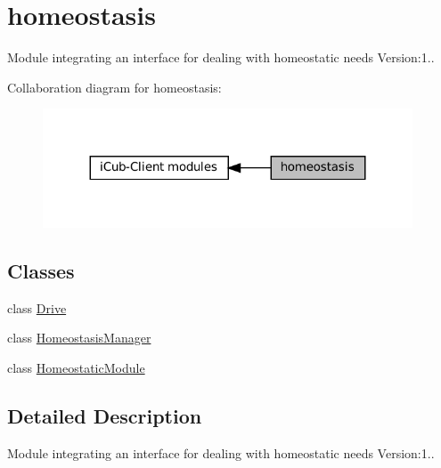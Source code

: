 \hypertarget{group__homeostasis}{}\section{homeostasis}
\label{group__homeostasis}


Module integrating an interface for dealing with homeostatic needs Version\+:1..  


Collaboration diagram for homeostasis\+:
\nopagebreak
\begin{figure}[H]
\begin{center}
\leavevmode
\includegraphics[width=311pt]{group__homeostasis}
\end{center}
\end{figure}
\subsection*{Classes}
\begin{DoxyCompactItemize}
\item 
class \hyperlink{group__homeostasis_classDrive}{Drive}
\item 
class \hyperlink{group__homeostasis_classHomeostasisManager}{Homeostasis\+Manager}
\item 
class \hyperlink{group__homeostasis_classHomeostaticModule}{Homeostatic\+Module}
\end{DoxyCompactItemize}


\subsection{Detailed Description}
Module integrating an interface for dealing with homeostatic needs Version\+:1.. 

